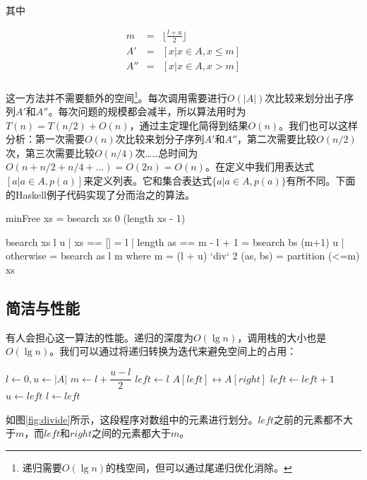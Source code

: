 \documentclass[b5paper]{ctexart}
\begin{document}
其中

\[ \begin{array}{rcl}
m & = & \displaystyle \lfloor \frac{l+u}{2} \rfloor \\
A' & = & [ x | x \in A, x \leq m ] \\
A''& = & [ x | x \in A, x > m ] \\
\end{array} \]

这一方法并不需要额外的空间\footnote{递归需要$O(\lg n)$的栈空间，但可以通过尾递归优化消除。}。每次调用需要进行$O(|A|)$次比较来划分出子序列$A'$和$A''$。每次问题的规模都会减半，所以算法用时为$T(n) = T(n/2) + O(n)$，通过主定理化简得到结果$O(n)$。我们也可以这样分析：第一次需要$O(n)$次比较来划分子序列$A'$和$A''$，第二次需要比较$O(n/2)$次，第三次需要比较$O(n/4)$次……总时间为$O(n + n/2 + n/4 + ...) = O(2n) = O(n)$。在定义中我们用表达式$[a | a \in A, p(a)]$来定义列表。它和集合表达式$\{a | a \in A, p(a) \}$有所不同。下面的Haskell例子代码实现了分而治之的算法。

\begin{Haskell}
minFree xs = bsearch xs 0 (length xs - 1)

bsearch xs l u | xs == [] = l
               | length as == m - l + 1 = bsearch bs (m+1) u
               | otherwise = bsearch as l m
    where
      m = (l + u) `div` 2
      (as, bs) = partition (<=m) xs
\end{Haskell}

\subsection{简洁与性能}
有人会担心这一算法的性能。递归的深度为$O(\lg n)$，调用栈的大小也是$O(\lg n)$。我们可以通过将递归转换为迭代来避免空间上的占用：

\begin{algorithmic}[1]
  \State $l \gets 0, u \gets |A|$
    \State $m \gets l + \dfrac{u - l}{2}$
    \State $left \gets l$
        \State $A[left] \leftrightarrow A[right]$
        \State $left \gets left + 1$
      \EndIf
    \EndFor
      \State $u \gets left$
    \Else
      \State $l \gets left$
    \EndIf
  \EndWhile
\EndFunction
\end{algorithmic}

如图\ref{fig:divide}所示，这段程序对数组中的元素进行划分。$left$之前的元素都不大于$m$，而$left$和$right$之间的元素都大于$m$。
\end{document}
